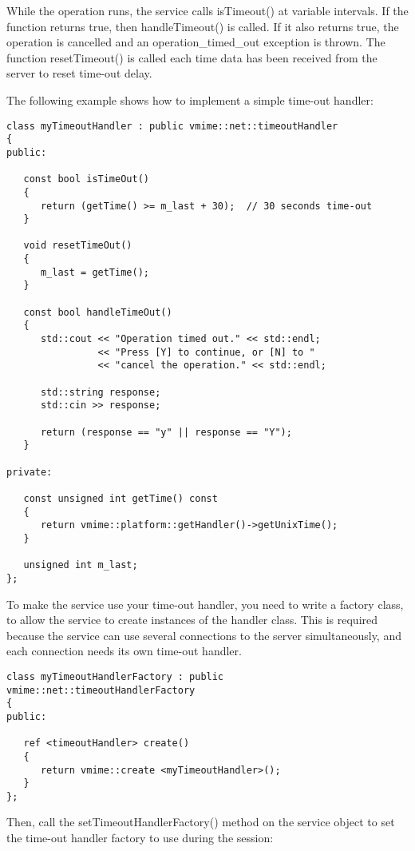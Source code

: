 While the operation runs, the service calls {\vcode isTimeout()} at variable
intervals. If the function returns {\vcode true}, then
{\vcode handleTimeout()} is called. If it also returns {\vcode true}, the
operation is cancelled and an {\vcode operation\_timed\_out} exception is
thrown. The function {\vcode resetTimeout()} is called each time data has
been received from the server to reset time-out delay.

The following example shows how to implement a simple time-out handler:

\begin{lstlisting}[caption={Implementing a simple time-out handler}]
class myTimeoutHandler : public vmime::net::timeoutHandler
{
public:

   const bool isTimeOut()
   {
      return (getTime() >= m_last + 30);  // 30 seconds time-out
   }

   void resetTimeOut()
   {
      m_last = getTime();
   }

   const bool handleTimeOut()
   {
      std::cout << "Operation timed out." << std::endl;
                << "Press [Y] to continue, or [N] to "
                << "cancel the operation." << std::endl;

      std::string response;
      std::cin >> response;

      return (response == "y" || response == "Y");
   }

private:

   const unsigned int getTime() const
   {
      return vmime::platform::getHandler()->getUnixTime();
   }

   unsigned int m_last;
};
\end{lstlisting}

To make the service use your time-out handler, you need to write a factory
class, to allow the service to create instances of the handler class. This
is required because the service can use several connections to the server
simultaneously, and each connection needs its own time-out handler.

\begin{lstlisting}
class myTimeoutHandlerFactory : public vmime::net::timeoutHandlerFactory
{
public:

   ref <timeoutHandler> create()
   {
      return vmime::create <myTimeoutHandler>();
   }
};
\end{lstlisting}

Then, call the {\vcode setTimeoutHandlerFactory()} method on the service object
to set the time-out handler factory to use during the session:

